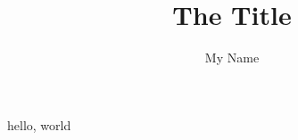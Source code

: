 \documentclass{article}
\author{My Name}
\title{The Title}
\begin{document}
 
  \maketitle 
  hello, world %
\end{document}
